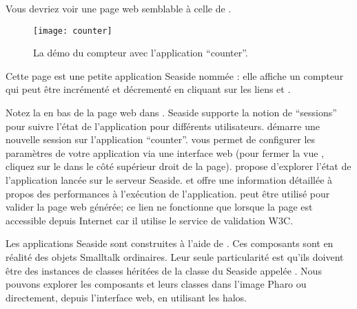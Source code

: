 \documentclass[a4paper,10pt,twoside]{book}
\begin{document}

\noindent
Vous devriez voir une page web semblable à celle de .

\noindent
{}


\begin{figure}[htb]
\begin{center}
\texttt{[image: counter]}
\caption{La démo du compteur avec l'application ``counter''.}
\end{center}
\end{figure}

\noindent
Cette page est une petite application Seaside nommée
: elle affiche un
compteur qui peut être incrémenté et décrementé en cliquant sur les
liens \link{++} et \link{{-}{-}}.

\noindent
{}

Notez la 
 en bas de la page web dans 
 .
Seaside supporte la notion de ``sessions'' pour suivre l'état de
l'application pour différents utilisateurs.
 démarre une nouvelle session sur l'application
``counter''.
 vous permet de 
configurer les paramètres de votre application via une interface
web (pour fermer la vue , cliquez sur le 
dans le côté supérieur droit de la page).
 propose d'explorer l'état de l'application
lancée sur le serveur Seaside.
 et  offre une information détaillée 
à propos des performances à l'exécution de l'application.
 peut être utilisé pour valider la page web générée;
ce lien ne fonctionne que lorsque la page est accessible depuis
Internet car il utilise le service de validation W3C.


Les applications Seaside sont construites à l'aide de
.
Ces composants sont en réalité des objets Smalltalk ordinaires.
Leur seule particularité est qu'ils doivent être des instances de
classes héritées de la classe du \framework Seaside appelée
.
Nous pouvons explorer les composants et leurs classes dans l'image
Pharo ou directement, depuis l'interface web, en utilisant les halos.
\end{document}
